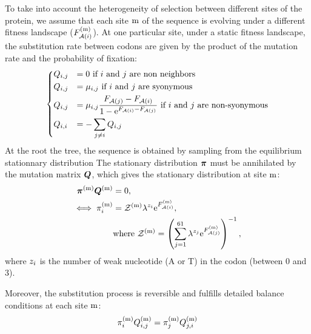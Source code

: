 To take into account the heterogeneity of selection between different sites of the protein, we assume that each site $\text{m}$ of the sequence is evolving under a different fitness landscape ($F_{\mathcal{A}({i})}^{(\text{m})}$).
At one particular site, under a static fitness landscape, the \gls{substitution} rate between \glspl{codon} are given by the product of the mutation rate and the probability of fixation:
\begin{equation}
    \begin{dcases}
        Q_{{i}, {j}} & = 0 \text{ if ${i}$ and ${j}$ are non neighbors} \\
        Q_{{i}, {j}} & = \mu_{{i}, {j}} \text{ if ${i}$ and ${j}$ are syonymous} \\
        Q_{{i}, {j}} & = \mu_{{i}, {j}} \dfrac{F_{\mathcal{A}({j})} - F_{\mathcal{A}({i})}}{1 - \mathrm{e}^{F_{\mathcal{A}({i})} - F_{\mathcal{A}({j})}} } \text{ if ${i}$ and ${j}$ are non-syonymous} \\
        Q_{{i}, {i}} & = - \sum\limits_{{j} \neq {i}} Q_{{i}, {j}}
    \end{dcases}
    \label{codonSubRates}
\end{equation}
At the root the tree, the sequence is obtained by sampling from the equilibrium stationnary distribution
The stationary distribution $\bm{\pi}$ must be annihilated by the mutation matrix $\bm{Q}$, which gives the stationary distribution at site $\text{m}$:
\begin{align}
    \bm{\pi}^{(\text{m})} \bm{Q}^{(\text{m})}
    & = 0 ,\\
    \iff \pi_{{i}}^{(\text{m})}
    & = \mathcal{Z}^{(\text{m})} \lambda^{{z}_{{i}}} \mathrm{e}^{F_{\mathcal{A}({i})}^{(\text{m})}},\\
    & \mathrm{ where } \ \mathcal{Z}^{(\text{m})} = \left( \sum\limits_{{j}=1}^{61} \lambda^{{z}_{{j}}} \mathrm{e}^{F_{\mathcal{A}({j})}^{(\text{m})}} \right)^{-1},
    \label{codonStationarity}
\end{align}
where ${z}_{{i}}$ is the number of weak nucleotide (A or T) in the codon (between 0 and 3).

Moreover, the \gls{substitution} process is reversible and fulfills detailed balance conditions at each site $\text{m}$:
\begin{align}
    \pi_{{i}}^{(\text{m})} Q_{{i}, {j}}^{(\text{m})} = \pi_{{j}}^{(\text{m})} Q_{{j}, {i}}^{(\text{m})}
    \label{codonSubBalance}
\end{align}

